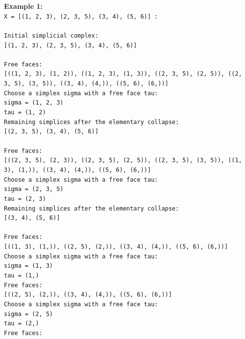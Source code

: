 \documentclass[a4paper,11pt]{article}
\begin{document}
\textbf{Example 1:}
\\
\texttt{X = [(1, 2, 3), (2, 3, 5), (3, 4), (5, 6)] : }
\\
\\
\texttt{Initial simplicial complex: } \\
\texttt{[(1, 2, 3), (2, 3, 5), (3, 4), (5, 6)]}\\
 \\
\texttt{Free faces:}\\
\texttt{[((1, 2, 3), (1, 2)), ((1, 2, 3), (1, 3)), ((2, 3, 5), (2, 5)), ((2, 3, 5), (3, 5)), ((3, 4), (4,)), ((5, 6), (6,))]}\\
\texttt{Choose a simplex sigma with a free face tau:}\\
\texttt{sigma = (1, 2, 3)}\\
\texttt{tau = (1, 2)}\\
\texttt{Remaining simplices after the elementary collapse:}\\
\texttt{[(2, 3, 5), (3, 4), (5, 6)]}\\
 \\
\texttt{Free faces:}\\
\texttt{[((2, 3, 5), (2, 3)), ((2, 3, 5), (2, 5)), ((2, 3, 5), (3, 5)), ((1, 3), (1,)), ((3, 4), (4,)), ((5, 6), (6,))]}\\
\texttt{Choose a simplex sigma with a free face tau:}\\
\texttt{sigma = (2, 3, 5)}\\
\texttt{tau = (2, 3)} \\
\texttt{Remaining simplices after the elementary collapse:}\\
\texttt{[(3, 4), (5, 6)]}\\
 \\
\texttt{Free faces:}\\
\texttt{[((1, 3), (1,)), ((2, 5), (2,)), ((3, 4), (4,)), ((5, 6), (6,))]}\\
\texttt{Choose a simplex sigma with a free face tau:}\\
\texttt{sigma = (1, 3)}\\
\texttt{tau = (1,)}\\
\texttt{Free faces:}\\
\texttt{[((2, 5), (2,)), ((3, 4), (4,)), ((5, 6), (6,))]}\\
\texttt{Choose a simplex sigma with a free face tau:}\\
\texttt{sigma = (2, 5)}\\
\texttt{tau = (2,)}\\
\texttt{Free faces:}\\
\end{document}
